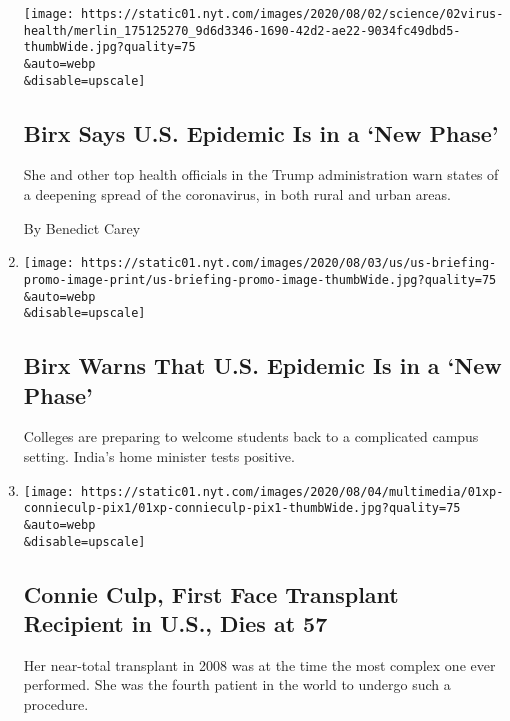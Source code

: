 \begin{enumerate}
  \texttt{[image: https://static01.nyt.com/images/2020/08/02/science/02virus-health/merlin\_175125270\_9d6d3346-1690-42d2-ae22-9034fc49dbd5-thumbWide.jpg?quality=75\\\&auto=webp\\\&disable=upscale]}

  \hypertarget{birx-says-us-epidemic-is-in-a-new-phase}{%
  \subsection{Birx Says U.S. Epidemic Is in a `New
  Phase'}\label{birx-says-us-epidemic-is-in-a-new-phase}}

  She and other top health officials in the Trump administration warn
  states of a deepening spread of the coronavirus, in both rural and
  urban areas.

  By Benedict Carey
\item
  \href{/2020/08/02/world/coronavirus-covid-19.html}{}

  \texttt{[image: https://static01.nyt.com/images/2020/08/03/us/us-briefing-promo-image-print/us-briefing-promo-image-thumbWide.jpg?quality=75\\\&auto=webp\\\&disable=upscale]}

  \hypertarget{birx-warns-that-us-epidemic-is-in-a-new-phase}{%
  \subsection{Birx Warns That U.S. Epidemic Is in a `New
  Phase'}\label{birx-warns-that-us-epidemic-is-in-a-new-phase}}

  Colleges are preparing to welcome students back to a complicated
  campus setting. India's home minister tests positive.
\item
  \href{/2020/08/01/us/Connie-culp-dead-face-transplant.html}{}

  \texttt{[image: https://static01.nyt.com/images/2020/08/04/multimedia/01xp-connieculp-pix1/01xp-connieculp-pix1-thumbWide.jpg?quality=75\\\&auto=webp\\\&disable=upscale]}

  \hypertarget{connie-culp-first-face-transplant-recipient-in-us-dies-at-57}{%
  \subsection{Connie Culp, First Face Transplant Recipient in U.S., Dies
  at
  57}\label{connie-culp-first-face-transplant-recipient-in-us-dies-at-57}}

  Her near-total transplant in 2008 was at the time the most complex one
  ever performed. She was the fourth patient in the world to undergo
  such a procedure.


\end{enumerate}

